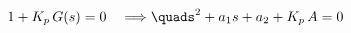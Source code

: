 \documentclass[preview]{standalone}
\begin{document}
\begin{align*}
1 + K_p \, G(s) = 0 \quad\Longrightarrow\quads^2 + a_1 s + a_2 + K_p\,A = 0
\end{align*}
\end{document}
